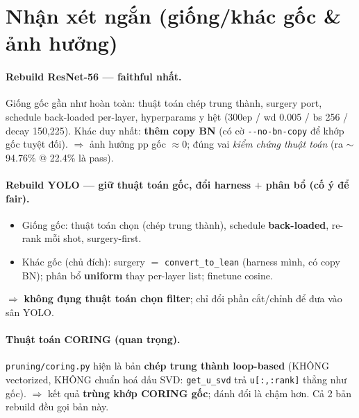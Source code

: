 \documentclass[11pt,a4paper]{article}
\newcommand{\code}[1]{\texttt{#1}}
\begin{document}
\section{Nhận xét ngắn (giống/khác gốc \& ảnh hưởng)}

\paragraph{Rebuild ResNet-56 --- faithful nhất.}
Giống gốc gần như hoàn toàn: thuật toán chép trung thành, surgery port, schedule back-loaded per-layer,
hyperparams y hệt (300ep / wd 0.005 / bs 256 / decay 150,225). Khác duy nhất: \textbf{thêm copy BN}
(có cờ \code{-{}-no-bn-copy} để khớp gốc tuyệt đối). $\Rightarrow$ ảnh hưởng pp gốc $\approx 0$; đúng
vai \emph{kiểm chứng thuật toán} (ra $\sim$94.76\% @ 22.4\% là pass).

\paragraph{Rebuild YOLO --- giữ thuật toán gốc, đổi harness $+$ phân bổ (cố ý để fair).}
\begin{itemize}
  \item Giống gốc: thuật toán chọn (chép trung thành), schedule \textbf{back-loaded}, re-rank mỗi shot,
        surgery-first.
  \item Khác gốc (chủ đích): surgery $=$ \code{convert\_to\_lean} (harness mình, có copy BN); phân bổ
        \textbf{uniform} thay per-layer list; finetune cosine.
\end{itemize}
$\Rightarrow$ \textbf{không đụng thuật toán chọn filter}; chỉ đổi phần cắt/chỉnh để đưa vào sân YOLO.

\paragraph{Thuật toán CORING (quan trọng).}
\code{pruning/coring.py} hiện là bản \textbf{chép trung thành loop-based} (KHÔNG vectorized, KHÔNG
chuẩn hoá dấu SVD: \code{get\_u\_svd} trả \code{u[:,:rank]} thẳng như gốc). $\Rightarrow$ kết quả
\textbf{trùng khớp CORING gốc}; đánh đổi là chậm hơn. Cả 2 bản rebuild đều gọi bản này.

\end{document}
